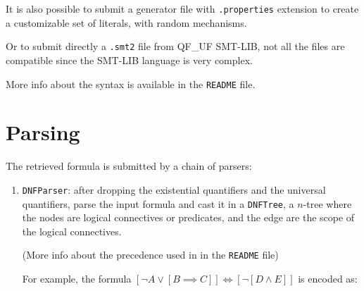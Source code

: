 \documentclass[11pt,a4paper]{article}
\begin{document}
    It is also possible to submit a generator file with \texttt{.properties} extension to create a customizable set of literals, with random mechanisms.

    Or to submit directly a \texttt{.smt2} file from QF\_UF SMT-LIB, not all the files are compatible since the SMT-LIB language is very complex.

    More info about the syntax is available in the \texttt{README} file.

    \section{Parsing}

    The retrieved formula is submitted by a chain of parsers:
    \begin{enumerate}
        \item \texttt{DNFParser}: after dropping the existential quantifiers and the universal quantifiers, parse the input formula and cast it in a \texttt{DNFTree}, a $n$-tree where the nodes are logical connectives or predicates, and the edge are the scope of the logical connectives.
        
        (More info about the precedence used in in the \texttt{README} file)
        
        For example, the formula $[\lnot A \lor [B \implies C] ] \iff [\lnot[ D \land E]]$ is encoded as:

        \begin{center}
        \end{center}


\end{enumerate}
\end{document}
